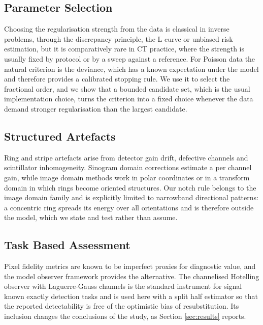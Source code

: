 \subsection{Parameter Selection}

Choosing the regularisation strength from the data is classical in inverse
problems, through the discrepancy principle, the L curve or unbiased risk
estimation, but it is comparatively rare in CT practice, where the strength
is usually fixed by protocol or by a sweep against a reference. For Poisson
data the natural criterion is the deviance, which has a known expectation
under the model and therefore provides a calibrated stopping rule. We use it
to select the fractional order, and we show that a bounded candidate set,
which is the usual implementation choice, turns the criterion into a fixed
choice whenever the data demand stronger regularisation than the largest
candidate.

\subsection{Structured Artefacts}

Ring and stripe artefacts arise from detector gain drift, defective channels
and scintillator inhomogeneity. Sinogram domain corrections estimate a per
channel gain, while image domain methods work in polar coordinates or in a
transform domain in which rings become oriented structures. Our notch rule
belongs to the image domain family and is explicitly limited to narrowband
directional patterns: a concentric ring spreads its energy over all
orientations and is therefore outside the model, which we state and test
rather than assume.

\subsection{Task Based Assessment}

Pixel fidelity metrics are known to be imperfect proxies for diagnostic
value, and the model observer framework \cite{barrett2004} provides the
alternative. The channelised Hotelling observer with Laguerre-Gauss channels
\cite{gallas2003} is the standard instrument for signal known exactly
detection tasks and is used here with a split half estimator so that the
reported detectability is free of the optimistic bias of resubstitution. Its
inclusion changes the conclusions of the study, as Section \ref{sec:results}
reports.
